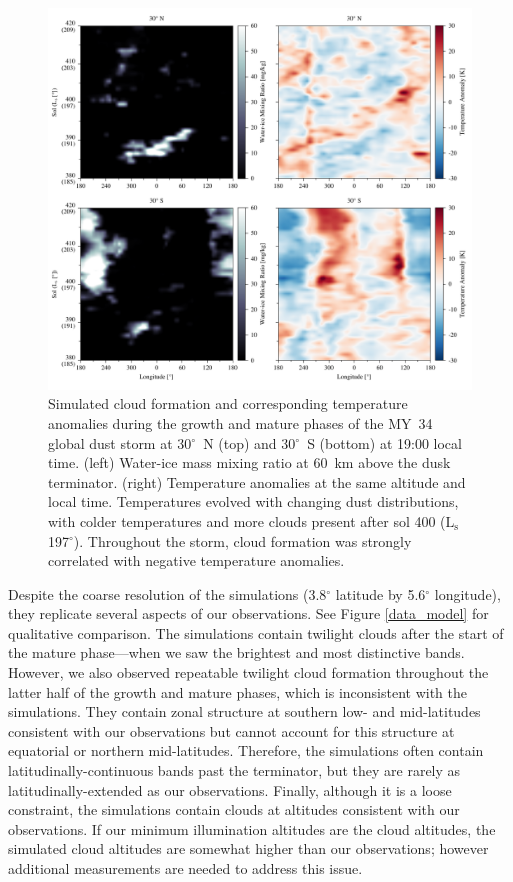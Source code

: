 \documentclass[draft]{agujournal2019}
\begin{document}
\begin{figure}[ht!]
    \centerline{\includegraphics[width=\textwidth]{lmd_2018_dust_storm_seasonal_profiles.pdf}}
    \caption{Simulated cloud formation and corresponding temperature anomalies during the growth and mature phases of the MY~34 global dust storm at 30$^\circ$~N (top) and 30$^\circ$~S (bottom) at 19:00 local time. (left) Water-ice mass mixing ratio at 60~km above the dusk terminator. (right) Temperature anomalies at the same altitude and local time. Temperatures evolved with changing dust distributions, with colder temperatures and more clouds present after sol 400 ($\mathrm{L_s}$ 197$^\circ$). Throughout the storm, cloud formation was strongly correlated with negative temperature anomalies.}
    \label{lmd_seasonal_profiles}
\end{figure}

Despite the coarse resolution of the simulations (3.8$^\circ$ latitude by 5.6$^\circ$ longitude), they replicate several aspects of our observations. See Figure \ref{data_model} for qualitative comparison. The simulations contain twilight clouds after the start of the mature phase---when we saw the brightest and most distinctive bands. However, we also observed repeatable twilight cloud formation throughout the latter half of the growth and mature phases, which is inconsistent with the simulations. They contain zonal structure at southern low- and mid-latitudes consistent with our observations but cannot account for this structure at equatorial or northern mid-latitudes. Therefore, the simulations often contain latitudinally-continuous bands past the terminator, but they are rarely as latitudinally-extended as our observations. Finally, although it is a loose constraint, the simulations contain clouds at altitudes consistent with our observations. If our minimum illumination altitudes are the cloud altitudes, the simulated cloud altitudes are somewhat higher than our observations; however additional measurements are needed to address this issue.
\end{document}
